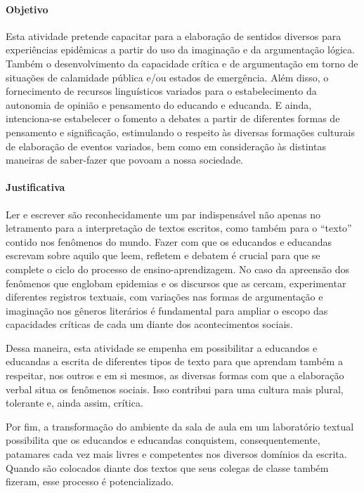\documentclass[12pt]{extarticle}
\begin{document}
\paragraph{Objetivo}

Esta atividade pretende capacitar para a elaboração de sentidos diversos
para experiências epidêmicas a partir do uso da imaginação e da
argumentação lógica. Também o desenvolvimento da capacidade crítica e de
argumentação em torno de situações de calamidade pública e/ou estados de
emergência. Além disso, o fornecimento de recursos linguísticos variados
para o estabelecimento da autonomia de opinião e pensamento do educando
e educanda. E ainda, intenciona-se estabelecer o fomento a debates a
partir de diferentes formas de pensamento e significação, estimulando o
respeito às diversas formações culturais de elaboração de eventos
variados, bem como em consideração às distintas maneiras de saber-fazer
que povoam a nossa sociedade.

\paragraph{Justificativa}

Ler e escrever são reconhecidamente um par indispensável não apenas no
letramento para a interpretação de textos escritos, como também para o
``texto'' contido nos fenômenos do mundo. Fazer com que os educandos e
educandas escrevam sobre aquilo que leem, refletem e debatem é crucial
para que se complete o ciclo do processo de ensino-aprendizagem. No caso
da apreensão dos fenômenos que englobam epidemias e os discursos que as
cercam, experimentar diferentes registros textuais, com variações nas
formas de argumentação e imaginação nos gêneros literários é fundamental
para ampliar o escopo das capacidades críticas de cada um diante dos
acontecimentos sociais.

Dessa maneira, esta atividade se empenha em possibilitar a educandos e
educandas a escrita de diferentes tipos de texto para que aprendam
também a respeitar, nos outros e em si mesmos, as diversas formas com
que a elaboração verbal situa os fenômenos sociais. Isso contribui para
uma cultura mais plural, tolerante e, ainda assim, crítica.

Por fim, a transformação do ambiente da sala de aula em um laboratório
textual possibilita que os educandos e educandas conquistem,
consequentemente, patamares cada vez mais livres e competentes nos
diversos domínios da escrita. Quando são colocados diante dos textos que
seus colegas de classe também fizeram, esse processo é potencializado.
\end{document}
